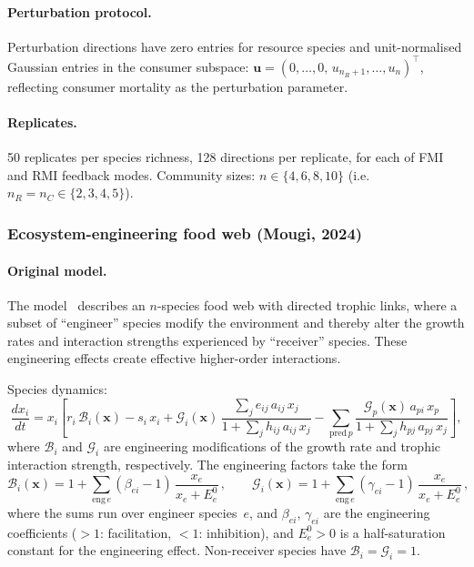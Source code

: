\documentclass[pdflatex,sn-mathphys-num]{sn-jnl}%
\begin{document}
\paragraph{Perturbation protocol.} Perturbation directions have zero entries for resource species and unit-normalised Gaussian entries in the consumer subspace: $\mathbf{u} = (0,\dots,0,\,u_{n_R+1},\dots,u_n)^\top$, reflecting consumer mortality as the perturbation parameter.

\paragraph{Replicates.} 50 replicates per species richness, 128 directions per replicate, for each of FMI and RMI feedback modes. Community sizes: $n \in \{4, 6, 8, 10\}$ (i.e.\ $n_R = n_C \in \{2, 3, 4, 5\}$).


\subsubsection{Ecosystem-engineering food web (Mougi, 2024)}
\label{sec:si_mougi}

\paragraph{Original model.} The model~\cite{mougi_ecosystem_2024} describes an $n$-species food web with directed trophic links, where a subset of ``engineer'' species modify the environment and thereby alter the growth rates and interaction strengths experienced by ``receiver'' species. These engineering effects create effective higher-order interactions.

Species dynamics:
\begin{equation}\label{eq:mougi}
 \frac{dx_i}{dt}
 = x_i\!\left[
  r_i\,\mathcal{B}_i(\mathbf{x})
 - s_i\, x_i
 + \mathcal{G}_i(\mathbf{x})\,
  \frac{\sum_j e_{ij}\,a_{ij}\,x_j}
   {1 + \sum_j h_{ij}\,a_{ij}\,x_j}
 - \sum_{\text{pred}\,p}
  \frac{\mathcal{G}_p(\mathbf{x})\,a_{pi}\,x_p}
   {1 + \sum_j h_{pj}\,a_{pj}\,x_j}
 \right],
\end{equation}
where $\mathcal{B}_i$ and $\mathcal{G}_i$ are engineering modifications of the growth rate and trophic interaction strength, respectively. The engineering factors take the form
\begin{equation}
 \mathcal{B}_i(\mathbf{x})
 = 1 + \sum_{\text{eng}\,e}
 (\beta_{ei} - 1)\,\frac{x_e}{x_e + E^0_e}\,,
 \qquad
 \mathcal{G}_i(\mathbf{x})
 = 1 + \sum_{\text{eng}\,e}
 (\gamma_{ei} - 1)\,\frac{x_e}{x_e + E^0_e}\,,
\end{equation}
where the sums run over engineer species~$e$, and $\beta_{ei}$, $\gamma_{ei}$ are the engineering coefficients ($>1$: facilitation, $<1$: inhibition), and $E^0_e > 0$ is a half-saturation constant for the engineering effect. Non-receiver species have $\mathcal{B}_i = \mathcal{G}_i = 1$.
\end{document}
